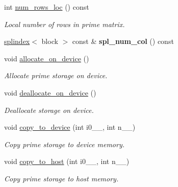 \begin{DoxyCompactItemize}
\item 
int \hyperlink{classsddk_1_1matrix__storage_3_01_t_00_01matrix__storage__t_1_1slab_01_4_a3235170fcd95e1c7c156df98c186913e}{num\+\_\+rows\+\_\+loc} () const 
\begin{DoxyCompactList}\small\item\em Local number of rows in prime matrix. \end{DoxyCompactList}\item 
\hypertarget{classsddk_1_1matrix__storage_3_01_t_00_01matrix__storage__t_1_1slab_01_4_ab7394cf4cb1548d87c8f5957217540e1}{}\hyperlink{classsddk_1_1splindex}{splindex}$<$ block $>$ const \& {\bfseries spl\+\_\+num\+\_\+col} () const \label{classsddk_1_1matrix__storage_3_01_t_00_01matrix__storage__t_1_1slab_01_4_ab7394cf4cb1548d87c8f5957217540e1}

\item 
void \hyperlink{classsddk_1_1matrix__storage_3_01_t_00_01matrix__storage__t_1_1slab_01_4_aff411a242bc539feafcfe671ddeb48be}{allocate\+\_\+on\+\_\+device} ()
\begin{DoxyCompactList}\small\item\em Allocate prime storage on device. \end{DoxyCompactList}\item 
void \hyperlink{classsddk_1_1matrix__storage_3_01_t_00_01matrix__storage__t_1_1slab_01_4_a58002f75caaf549cb71abb2781a24dd6}{deallocate\+\_\+on\+\_\+device} ()
\begin{DoxyCompactList}\small\item\em Deallocate storage on device. \end{DoxyCompactList}\item 
void \hyperlink{classsddk_1_1matrix__storage_3_01_t_00_01matrix__storage__t_1_1slab_01_4_ab0b9780965976605138101bd29cc9eeb}{copy\+\_\+to\+\_\+device} (int i0\+\_\+\+\_\+, int n\+\_\+\+\_\+)
\begin{DoxyCompactList}\small\item\em Copy prime storage to device memory. \end{DoxyCompactList}\item 
void \hyperlink{classsddk_1_1matrix__storage_3_01_t_00_01matrix__storage__t_1_1slab_01_4_ad88e4399b66de4dfbf522dc96cd53136}{copy\+\_\+to\+\_\+host} (int i0\+\_\+\+\_\+, int n\+\_\+\+\_\+)
\begin{DoxyCompactList}\small\item\em Copy prime storage to host memory. \end{DoxyCompactList}\end{DoxyCompactItemize}
